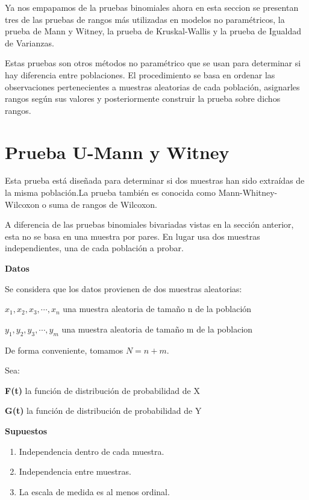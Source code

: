 \documentclass[a4paper,oneside,openany]{book}
\begin{document}
Ya nos empapamos de la pruebas binomiales ahora en esta seccion se
presentan tres de las pruebas de rangos más utilizadas en modelos no
paramétricos, la prueba de Mann y Witney, la prueba de Kruskal-Wallis y
la prueba de Igualdad de Varianzas.

Estas pruebas son otros métodos no paramétrico que se usan para
determinar si hay diferencia entre poblaciones. El procedimiento se basa
en ordenar las observaciones pertenecientes a muestras aleatorias de
cada población, asignarles rangos según sus valores y posteriormente
construir la prueba sobre dichos rangos.

\chapter{Prueba U-Mann y Witney}\label{prueba-u-mann-y-witney}

Esta prueba está diseñada para determinar si dos muestras han sido
extraídas de la misma población.La prueba también es conocida como
Mann-Whitney-Wilcoxon o suma de rangos de Wilcoxon.

A diferencia de las pruebas binomiales bivariadas vistas en la sección
anterior, esta no se basa en una muestra por pares. En lugar usa dos
muestras independientes, una de cada población a probar.

\textbf{Datos}

Se considera que los datos provienen de dos muestras aleatorias:

\(x_{1},x_{2},x_{3},\cdots,x_{n}\) una muestra aleatoria de tamaño n de
la población

\(y_{1},y_{2},y_{3},\cdots,y_{m}\) una muestra aleatoria de tamaño m de
la poblacion

De forma conveniente, tomamos \(N=n+m\).

Sea:

\textbf{F(t)} la función de distribución de probabilidad de X

\textbf{G(t)} la función de distribución de probabilidad de Y

\textbf{Supuestos}

\begin{enumerate}
\def\labelenumi{\arabic{enumi})}
\item
  Independencia dentro de cada muestra.
\item
  Independencia entre muestras.
\item
  La escala de medida es al menos ordinal.
\end{enumerate}
\end{document}

